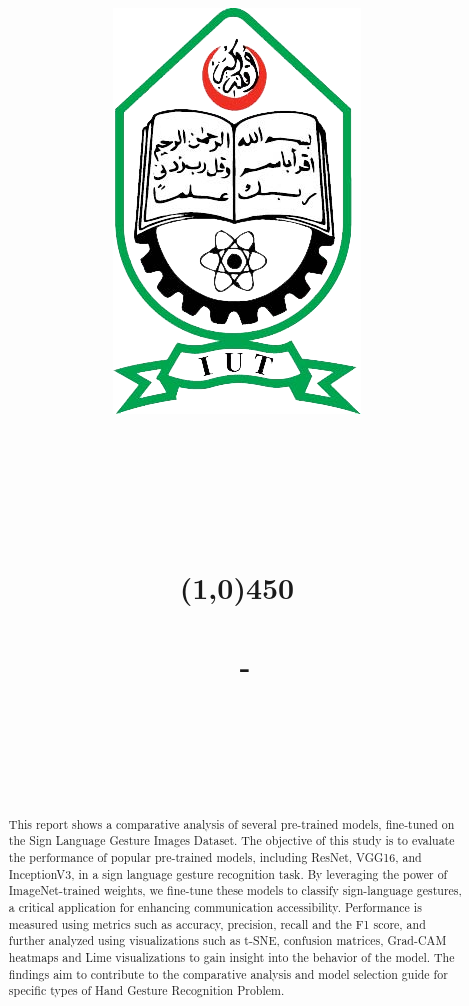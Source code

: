 \documentclass{report}
\title{
	\begin{figure}[!htb]
		\includegraphics[scale=0.2]{rsx/iut_logo.png}
		\centering
	\end{figure}

        \Large{\textbf{\university}}\\	
	\large{\textbf{\univAddress}}\\	
	\vspace{1.1in}
        \Large{\textbf{\huge{\mainTopic}}}\\
	\line(1,0){450}\\
	\vspace{0.15in}
	\Large{\textbf{\huge{\reporttype}}}\\
        \vspace{.5in}
	\LARGE{\textbf{\coursecode \ - \coursename}}\\
        \vspace{.2in}
}
\author{
        \Large{\textbf{\Name}}\\\\
        \vspace{0.1in}
        \Large{\textbf{\bscProgram}}\\\\
        \Large{\textbf{\dept}}
}
\begin{document}
\maketitle
\large


\begin{abstract}
This report shows a comparative analysis of several pre-trained models, fine-tuned on the Sign Language Gesture Images Dataset. The objective of this study is to evaluate the performance of popular pre-trained models, including ResNet, VGG16, and InceptionV3, in a sign language gesture recognition task. By leveraging the power of ImageNet-trained weights, we fine-tune these models to classify sign-language gestures, a critical application for enhancing communication accessibility. Performance is measured using metrics such as accuracy, precision, recall and the F1 score, and further analyzed using visualizations such as t-SNE, confusion matrices, Grad-CAM heatmaps and Lime visualizations to gain insight into the behavior of the model. The findings aim to contribute to the comparative analysis and model selection guide for specific types of Hand Gesture Recognition Problem.
\end{abstract}


\tableofcontents







% 
% 
% 
% 





\end{document}

